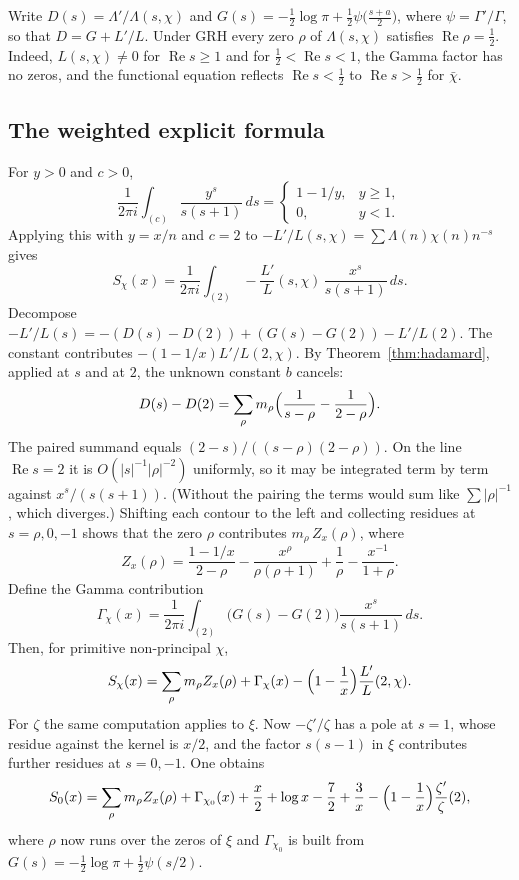 \documentclass[11pt]{amsart}
\theoremstyle{definition}
\theoremstyle{remark}
\newcommand{\Lam}{\Lambda}
\renewcommand{\Re}{\operatorname{Re}}
\begin{document}
Write $D(s)=\Lam'/\Lam(s,\chi)$ and $G(s)=-\tfrac12\log\pi+\tfrac12\psi\bigl(\tfrac{s+a}2\bigr)$, where $\psi=\Gamma'/\Gamma$, so that $D=G+L'/L$. Under GRH every zero $\rho$ of $\Lam(s,\chi)$ satisfies $\Re\rho=\tfrac12$. Indeed, $L(s,\chi)\ne0$ for $\Re s\ge 1$ and for $\tfrac12<\Re s<1$, the Gamma factor has no zeros, and the functional equation reflects $\Re s<\tfrac12$ to $\Re s>\tfrac12$ for $\bar\chi$.

\subsection{The weighted explicit formula}

For $y>0$ and $c>0$,
\[
\frac1{2\pi i}\int_{(c)}\frac{y^s}{s(s+1)}\,ds=\begin{cases}1-1/y,&y\ge1,\\ 0,&y<1.\end{cases}
\]
Applying this with $y=x/n$ and $c=2$ to $-L'/L(s,\chi)=\sum\Lam(n)\chi(n)n^{-s}$ gives
\begin{equation}\label{eq:perron}
S_\chi(x)=\frac1{2\pi i}\int_{(2)}-\frac{L'}{L}(s,\chi)\,\frac{x^s}{s(s+1)}\,ds .
\end{equation}
Decompose $-L'/L(s)=-(D(s)-D(2))+(G(s)-G(2))-L'/L(2)$. The constant contributes $-(1-1/x)L'/L(2,\chi)$. By Theorem~\ref{thm:hadamard}, applied at $s$ and at $2$, the unknown constant $b$ cancels:
\[
D(s)-D(2)=\sum_\rho m_\rho\Bigl(\frac1{s-\rho}-\frac1{2-\rho}\Bigr).
\]
The paired summand equals $(2-s)/((s-\rho)(2-\rho))$. On the line $\Re s=2$ it is $O(|s|^{-1}|\rho|^{-2})$ uniformly, so it may be integrated term by term against $x^s/(s(s+1))$. (Without the pairing the terms would sum like $\sum|\rho|^{-1}$, which diverges.) Shifting each contour to the left and collecting residues at $s=\rho,0,-1$ shows that the zero $\rho$ contributes $m_\rho\,Z_x(\rho)$, where
\[
Z_x(\rho)=\frac{1-1/x}{2-\rho}-\frac{x^\rho}{\rho(\rho+1)}+\frac1\rho-\frac{x^{-1}}{1+\rho}.
\]
Define the Gamma contribution
\[
\Gamma_\chi(x)=\frac1{2\pi i}\int_{(2)}\bigl(G(s)-G(2)\bigr)\frac{x^s}{s(s+1)}\,ds .
\]
Then, for primitive non-principal $\chi$,
\begin{equation}\label{eq:ef}
S_\chi(x)=\sum_\rho m_\rho Z_x(\rho)+\Gamma_\chi(x)-\Bigl(1-\frac1x\Bigr)\frac{L'}{L}(2,\chi).
\end{equation}
For $\zeta$ the same computation applies to $\xi$. Now $-\zeta'/\zeta$ has a pole at $s=1$, whose residue against the kernel is $x/2$, and the factor $s(s-1)$ in $\xi$ contributes further residues at $s=0,-1$. One obtains
\begin{equation}\label{eq:efzeta}
S_0(x)=\sum_\rho m_\rho Z_x(\rho)+\Gamma_{\chi_0}(x)+\frac x2+\log x-\frac72+\frac3x-\Bigl(1-\frac1x\Bigr)\frac{\zeta'}{\zeta}(2),
\end{equation}
where $\rho$ now runs over the zeros of $\xi$ and $\Gamma_{\chi_0}$ is built from $G(s)=-\tfrac12\log\pi+\tfrac12\psi(s/2)$.
\end{document}

